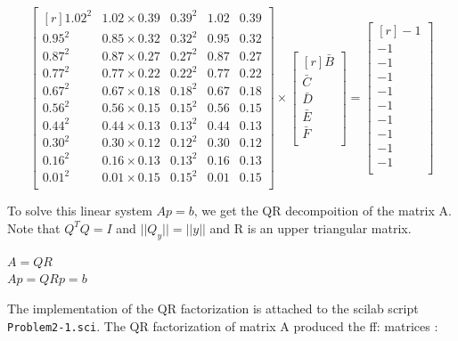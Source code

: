 \documentclass[a4paper]{article}
\begin{document}
			$$\begin{bmatrix}[r]
				1.02^{2} & 1.02 \times 0.39& 0.39^2 & 1.02 & 0.39\\
				0.95^{2} & 0.85 \times 0.32 & 0.32^2 & 0.95 & 0.32\\
				0.87^{2} & 0.87 \times 0.27 & 0.27^2 & 0.87 & 0.27\\
				0.77^{2} & 0.77 \times 0.22 & 0.22^2 & 0.77 & 0.22\\
				0.67^{2} & 0.67 \times 0.18& 0.18^2 & 0.67 & 0.18\\
				0.56^{2} & 0.56 \times 0.15 & 0.15^2 & 0.56 & 0.15\\
				0.44^{2} & 0.44 \times 0.13 & 0.13^2 & 0.44 & 0.13\\
				0.30^{2} & 0.30 \times 0.12 & 0.12^2 & 0.30 & 0.12\\
				0.16^{2} & 0.16 \times 0.13 & 0.13^2 & 0.16 & 0.13\\
				0.01^{2} & 0.01 \times 0.15 & 0.15^2 & 0.01 & 0.15\\

			\end{bmatrix} \times \begin{bmatrix}[r]
				\bar{B}\\
				\bar{C}\\
				\bar{D}\\
				\bar{E}\\
				\bar{F}\\
			\end{bmatrix} = \begin{bmatrix}[r]
					-1\\
					-1\\
					-1\\
					-1\\
					-1\\
					-1\\
					-1\\
					-1\\
					-1\\
					-1\\
			\end{bmatrix}$$

To solve this linear system $Ap = b$, we get the QR decompoition of the matrix A. Note that $Q^{T}Q = I$ and $||Q_{y}|| = ||y||$ and R is an upper triangular matrix. 
\begin{center}
		$ A = QR $ \\
		$ Ap = QRp = b $
\end{center}


The implementation of the QR factorization is attached to the scilab script \texttt{Problem2-1.sci}. The QR factorization of matrix A produced the ff: matrices :
\end{document}

